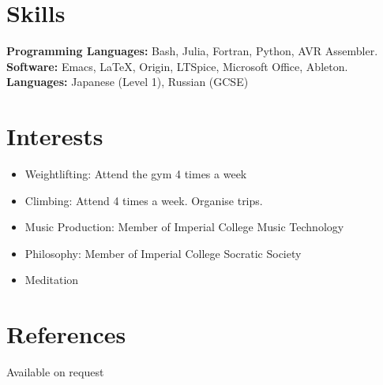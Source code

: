 \documentclass[margin]{res}
\begin{document}
\begin{resume}
\begin{itemize}
 \end{itemize}

\singlespacing
\section{Skills}
   {\bf Programming Languages:} 
 Bash, Julia, Fortran, Python, AVR Assembler.\\
     {\bf Software:} 
 Emacs, \LaTeX, Origin, LTSpice, Microsoft Office, Ableton.\\
{\bf Languages:}
 Japanese (Level 1), Russian (GCSE)
\singlespacing

\section{Interests}
\begin{itemize}\itemsep -2pt
\item Weightlifting: Attend the gym 4 times a week
\item Climbing: Attend 4 times a week. Organise trips.
\item Music Production: Member of Imperial College Music Technology
\item Philosophy: Member of Imperial College Socratic Society
\item Meditation
\end{itemize}
\section{References}
Available on request

\end{resume} 
\end{document}
